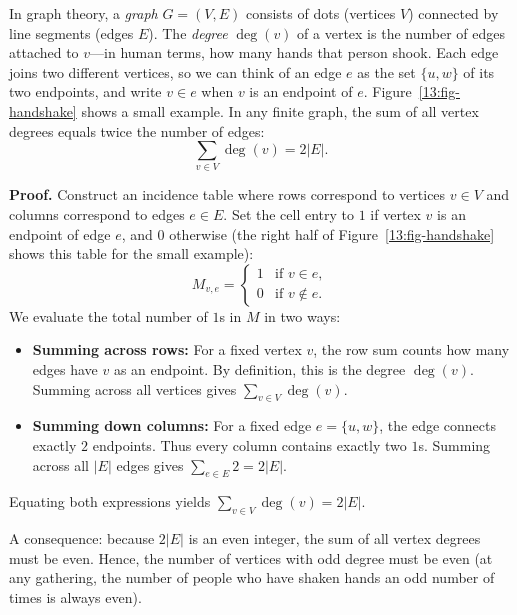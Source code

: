 \begin{example}
In graph theory, a \emph{graph} $G = (V, E)$ consists of dots (vertices $V$) connected by line segments (edges $E$). The \emph{degree} $\deg(v)$ of a vertex is the number of edges attached to $v$---in human terms, how many hands that person shook. Each edge joins two different vertices, so we can think of an edge $e$ as the set $\{u, w\}$ of its two endpoints, and write $v \in e$ when $v$ is an endpoint of $e$. Figure~\ref{13:fig-handshake} shows a small example. In any finite graph, the sum of all vertex degrees equals twice the number of edges:
\[
\sum_{v \in V} \deg(v) = 2|E|.
\]

\textbf{Proof.}
Construct an incidence table where rows correspond to vertices $v \in V$ and columns correspond to edges $e \in E$. Set the cell entry to $1$ if vertex $v$ is an endpoint of edge $e$, and $0$ otherwise (the right half of Figure~\ref{13:fig-handshake} shows this table for the small example):
\[
M_{v, e} = \begin{cases} 1 & \text{if } v \in e, \\ 0 & \text{if } v \notin e. \end{cases}
\]
We evaluate the total number of $1$s in $M$ in two ways:
\begin{itemize}
\item \textbf{Summing across rows:} For a fixed vertex $v$, the row sum counts how many edges have $v$ as an endpoint. By definition, this is the degree $\deg(v)$. Summing across all vertices gives $\sum_{v \in V} \deg(v)$.
\item \textbf{Summing down columns:} For a fixed edge $e = \{u, w\}$, the edge connects exactly $2$ endpoints. Thus every column contains exactly two $1$s. Summing across all $|E|$ edges gives $\sum_{e \in E} 2 = 2|E|$.
\end{itemize}
Equating both expressions yields $\sum_{v \in V} \deg(v) = 2|E|$. 

A consequence: because $2|E|$ is an even integer, the sum of all vertex degrees must be even. Hence, the number of vertices with odd degree must be even (at any gathering, the number of people who have shaken hands an odd number of times is always even).
\end{example}

